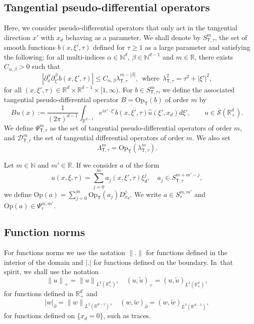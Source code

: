 \documentclass[10pt]{amsart}
\theoremstyle{plain}
\theoremstyle{definition}
\def\R{\mathbb{R}}
\def\N{\mathbb{N}}
\newcommand{\inp}[2]{(#1, #2)}
\newcommand{\Op}{\ensuremath{\mathrm{Op}}}
\newcommand{\Opt}{\ensuremath{\mathrm{Op}_{\scriptscriptstyle{\mathsf{T}}}}}
\newcommand{\Norm}[2]{{\| #1 \|}_{#2}}
\newcommand{\norm}[2]{{|#1|}_{#2}}
\newcommand{\lsct}{\lambda_{{\scriptscriptstyle{\mathsf T}},\tau}}
\newcommand{\Lsct}{\Lambda_{{\scriptscriptstyle{\mathsf T}},\tau}}
\newcommand{\Ssc}{S_\tau}
\newcommand{\Psisc}{\Psi_\tau}
\newcommand{\Ssct}{S_{{\scriptscriptstyle{\mathsf T}},\tau}}
\newcommand{\Psisct}{\Psi_{{\scriptscriptstyle{\mathsf T}},\tau}}
\newcommand{\Dsct}{\mathscr{D}_{{\scriptscriptstyle{\mathsf T}},\tau}}
\newcommand{\Sbarp}{\ensuremath{\overline{\mathscr{S}}(\Rdp)}}
\newcommand{\Rdp}{\R^d_+}
\begin{document}
\subsection{Tangential pseudo-differential operators}\label{ss2}
Here, we consider pseudo-diffe\-ren\-tial operators that only act in the
tangential direction $x'$ with $x_d$ behaving as a parameter. We shall
denote by $\Ssct^m$, the set of smooth functions $b(x,\xi',\tau)$
defined for $\tau\geq 1$ as a large parameter and satisfying the
following: for all multi-indices $\alpha\in\N^d$,
$\beta\in\N^{d-1}$ and $m\in\R$, there exists
$C_{\alpha,\beta}>0$ such
that
\begin{equation*}
|\partial_x^{\alpha}\partial^{\beta}_{\xi'}b(x,\xi',\tau)|\leq
C_{\alpha,\beta}\lsct^{m-|\beta|}, \ \
\text{where} \ \ \lsct^2=\tau^2+|\xi'|^2,
\end{equation*}
for all
$(x,\xi',\tau)\in\R^d\times\R^{d-1}\times [1, \infty)$. For $b\in \Ssct^m$,
we define the associated tangential pseudo-differential operator
$B=\Opt (b)$ of order $m$ by
\begin{equation*}
Bu(x):=\frac{1}{(2\pi)^{d-1}}
\int_{\R^{d-1}}e^{i x'\cdot \xi'}b(x,\xi',\tau)\hat{u}(\xi',x_d)d{\xi'},
\qquad u\in\Sbarp.
\end{equation*}
We define $\Psisct^m$ as the set of tangential
pseudo-differential operators of order $m$, and
$\Dsct^m$ the set of tangential differential
operators of order $m$. We also set
\begin{equation*}
\Lsct^m=\Opt (\lsct^m).
\end{equation*}

Let $m\in\N$ and $m'\in\R$. If we consider $a$ of the form
\begin{equation*}
a(x,\xi,\tau)=\sum_{j=0}^{m}a_j(x,\xi',\tau)\xi_d^j,
\quad a_j\in \Ssct^{m+m'-j},
\end{equation*}
we define $\Op (a)=\sum_{j=0}^{m}\Opt (a_j)D^j_{x_d}$. We
write $a\in \Ssc^{m,m'}$ and $\Op (a)\in \Psisc^{m,m'}$.

\subsection{Function norms}
\label{sec: Function norms}
For functions norms we use the notation $\|.\|$ for functions
defined in the interior of the domain and $|.|$ for functions defined on the boundary.
In~that spirit, we shall use the notation
\begin{equation*}
\Norm{u}{+}=\Norm{u}{L^2(\Rdp)}, \quad
\inp{u}{\tilde{u}}_+=\inp{u}{\tilde{u}}_{L^2(\Rdp)},
\end{equation*}
for functions defined in $\Rdp$ and
\begin{equation*}
\norm{w}{\partial}=\Norm{w}{L^2(\R^{d-1})}, \quad
\inp{w}{\tilde{w}}_{\partial}=\inp{w}{\tilde{w}}_{L^2(\R^{d-1})},
\end{equation*}
for functions defined on $\{ x_d =0\}$, such as traces.
\end{document}
